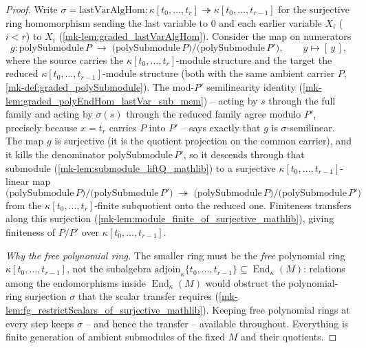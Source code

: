 \begin{proof}
  \leanok
    Write \(\sigma = \mathrm{lastVarAlgHom} : \kappa[t_0, \dots, t_r]
  \twoheadrightarrow \kappa[t_0, \dots, t_{r-1}]\) for the surjective ring
  homomorphism sending the last variable to \(0\) and each earlier variable \(X_i\)
  (\(i < r\)) to \(X_i\) (\ref{mk-lem:graded_lastVarAlgHom}). Consider the map on numerators
  \[
    g : \mathrm{polySubmodule}\,P \;\longrightarrow\;
      \bigl(\mathrm{polySubmodule}\,P\bigr)\big/
        \bigl(\mathrm{polySubmodule}\,P'\bigr), \qquad y \longmapsto [\,y\,],
  \]
  where the source carries the \(\kappa[t_0, \dots, t_r]\)-module structure and the
  target the reduced \(\kappa[t_0, \dots, t_{r-1}]\)-module structure (both with the
  same ambient carrier \(P\), \ref{mk-def:graded_polySubmodule}). The mod-\(P'\)
  semilinearity identity (\ref{mk-lem:graded_polyEndHom_lastVar_sub_mem}) -- acting by
  \(s\) through the full family and acting by \(\sigma(s)\) through the reduced family
  agree modulo \(P'\), precisely because \(x = t_r\) carries \(P\) into \(P'\) --
  says exactly that \(g\) is \(\sigma\)-semilinear. The map \(g\) is surjective (it is
  the quotient projection on the common carrier), and it kills the denominator
  \(\mathrm{polySubmodule}\,P'\), so it descends through that submodule
  (\ref{mk-lem:submodule_liftQ_mathlib}) to a surjective
  \(\kappa[t_0, \dots, t_{r-1}]\)-linear map
  \[
    \bigl(\mathrm{polySubmodule}\,P\bigr)\big/\bigl(\mathrm{polySubmodule}\,P'\bigr)
      \;\twoheadrightarrow\;
    \bigl(\mathrm{polySubmodule}\,P\bigr)\big/\bigl(\mathrm{polySubmodule}\,P'\bigr)
  \]
  from the \(\kappa[t_0, \dots, t_r]\)-finite subquotient onto the reduced one.
  Finiteness transfers along this surjection
  (\ref{mk-lem:module_finite_of_surjective_mathlib}), giving finiteness of \(P/P'\)
  over \(\kappa[t_0, \dots, t_{r-1}]\).

  \emph{Why the free polynomial ring.} The smaller ring must be the \emph{free}
  polynomial ring \(\kappa[t_0, \dots, t_{r-1}]\), not the subalgebra
  \(\mathrm{adjoin}_\kappa\{t_0, \dots, t_{r-1}\} \subseteq
  \operatorname{End}_\kappa(M)\): relations among the endomorphisms inside
  \(\operatorname{End}_\kappa(M)\) would obstruct the polynomial-ring surjection
  \(\sigma\) that the scalar transfer requires
  (\ref{mk-lem:fg_restrictScalars_of_surjective_mathlib}). Keeping free polynomial
  rings at every step keeps \(\sigma\) -- and hence the transfer -- available
  throughout. Everything is finite generation of ambient submodules of the fixed
  \(M\) and their quotients.
\end{proof}

